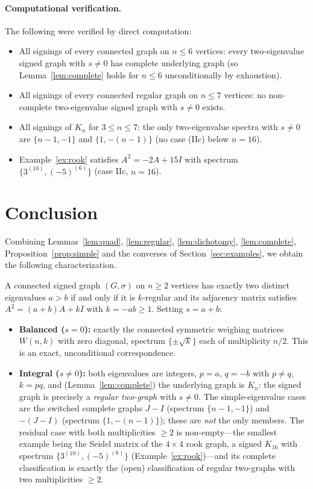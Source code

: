 \documentclass{amsart}
\theoremstyle{definition}
\begin{document}
\paragraph{Computational verification.} The following were verified by direct
computation:
\begin{itemize}
\item All signings of every connected graph on $n\le6$ vertices: every
two-eigenvalue signed graph with $s\ne0$ has complete underlying graph (so
Lemma~\ref{lem:complete} holds for $n\le6$ unconditionally by exhaustion).
\item All signings of every connected regular graph on $n\le7$ vertices: no
non-complete two-eigenvalue signed graph with $s\ne0$ exists.
\item All signings of $K_n$ for $3\le n\le7$: the only two-eigenvalue spectra
with $s\ne0$ are $\{n-1,-1\}$ and $\{1,-(n-1)\}$ (no case (IIc) below $n=16$).
\item Example~\ref{ex:rook} satisfies $A^2=-2A+15I$ with spectrum
$\{3^{(10)},(-5)^{(6)}\}$ (case IIc, $n=16$).
\end{itemize}

\section{Conclusion}\label{sec:conclusion}

Combining Lemmas~\ref{lem:quad}, \ref{lem:regular}, \ref{lem:dichotomy},
\ref{lem:complete}, Proposition~\ref{prop:simple} and the converses of
Section~\ref{sec:examples}, we obtain the following characterization.

A connected signed graph $(G,\sigma)$ on $n\ge2$ vertices has exactly two
distinct eigenvalues $a>b$ if and only if it is $k$-regular and its adjacency
matrix satisfies $A^2=(a+b)A+kI$ with $k=-ab\ge1$. Setting $s=a+b$:
\begin{itemize}
\item \textbf{Balanced ($s=0$):} exactly the connected symmetric weighing
matrices $W(n,k)$ with zero diagonal, spectrum $\{\pm\sqrt k\}$ each of
multiplicity $n/2$. This is an exact, unconditional correspondence.
\item \textbf{Integral ($s\ne0$):} both eigenvalues are integers, $p=a$,
$q=-b$ with $p\ne q$, $k=pq$, and (Lemma~\ref{lem:complete}) the underlying
graph is $K_n$: the signed graph is precisely a \emph{regular two-graph} with
$s\ne0$. The simple-eigenvalue cases are the switched complete graphs
$J-I$ (spectrum $\{n-1,-1\}$) and $-(J-I)$ (spectrum $\{1,-(n-1)\}$); these are
\emph{not} the only members. The residual case with both multiplicities $\ge2$
is non-empty---the smallest example being the Seidel matrix of the $4\times4$
rook graph, a signed $K_{16}$ with spectrum $\{3^{(10)},(-5)^{(6)}\}$
(Example~\ref{ex:rook})---and its complete classification is exactly the
(open) classification of regular two-graphs with two multiplicities $\ge2$.
\end{itemize}
\end{document}
